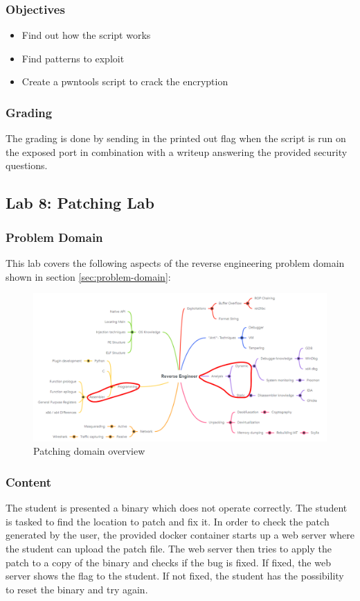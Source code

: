 \subsubsection*{Objectives}
\begin{itemize}
    \item Find out how the script works
    \item Find patterns to exploit
    \item Create a pwntools script to crack the encryption
\end{itemize}
\subsubsection*{Grading}
The grading is done by sending in the printed out flag when the script is run on the exposed port in combination with a writeup answering the provided security questions.
\pagebreak

\subsection{Lab 8: Patching Lab}
\subsubsection*{Problem Domain}
This lab covers the following aspects of the reverse engineering problem domain shown in section \ref{sec:problem-domain}:
\vspace{-2ex}
\begin{figure}[H]
    \includegraphics[width=\textwidth]{resources/patching-overview-light.png}
    \caption{Patching domain overview}
    \label{fig:patching-overview}
\end{figure}
\subsubsection*{Content}
The student is presented a binary which does not operate correctly. The student is tasked to find the location to patch and fix it. In order to check the patch generated by the user, the provided docker container starts up a web server where the student can upload the patch file. The web server then tries to apply the patch to a copy of the binary and checks if the bug is fixed. If fixed, the web server shows the flag to the student. If not fixed, the student has the possibility to reset the binary and try again.


